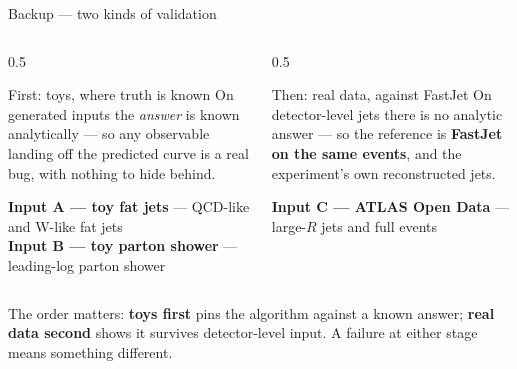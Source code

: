 \documentclass[aspectratio=169,10pt]{beamer}
\newcommand{\inputtag}[2]{{\footnotesize\textbf{\textcolor{#1}{#2}}}}
\newcommand{\toyAbody}{\inputtag{fjblue}{Input A --- toy fat jets}}
\newcommand{\toyBbody}{\inputtag{fjblue}{Input B --- toy parton shower}}
\newcommand{\realCbody}{\inputtag{fjgreen}{Input C --- ATLAS Open Data}}
\begin{document}
\begin{frame}{Backup --- two kinds of validation}
\begin{columns}[T]
\begin{column}{0.5\textwidth}
\begin{block}{First: toys, where truth is known}
\small On generated inputs the \emph{answer} is known analytically --- so any
observable landing off the predicted curve is a real bug, with nothing to hide
behind.
\end{block}
\smallskip
\toyAbody{} --- QCD-like and W-like fat jets\\
\toyBbody{} --- leading-log parton shower
\end{column}
\begin{column}{0.5\textwidth}
\begin{block}{Then: real data, against FastJet}
\small On detector-level jets there is no analytic answer --- so the reference is
\textbf{FastJet on the same events}, and the experiment's own reconstructed jets.
\end{block}
\smallskip
\realCbody{} --- large-$R$ jets and full events
\end{column}
\end{columns}
\vspace{0.8em}
\begin{block}{}
\small The order matters: \textbf{toys first} pins the algorithm against a known
answer; \textbf{real data second} shows it survives detector-level input. A
failure at either stage means something different.
\end{block}
\end{frame}
\end{document}
